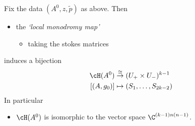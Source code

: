 \begin{paracol}{2} %
  \begin{thm}
    Fix the data $(A^0,z,\tilde p)$ as above.
    Then
    \begin{itemize}
      \item the \emph{`local monodromy map'}
        \begin{itemize}
          \item taking the stokes matrices
        \end{itemize}
    \end{itemize}
    induces a bijection
    \begin{align*}
      \cH(A^0)&\overset{\cong}{\to}(U_+\times U_-)^{k-1}
    \\ \left[(A,g_0)\right] &\mapsto(S_1,\dots,S_{2k-2})
    \end{align*}
    In particular
    \begin{itemize}
      \item $\cH(A^0)$ is isomorphic to the vector space $\C^{(k-1)n(n-1)}$.
    \end{itemize}


\end{thm}
\end{paracol}
